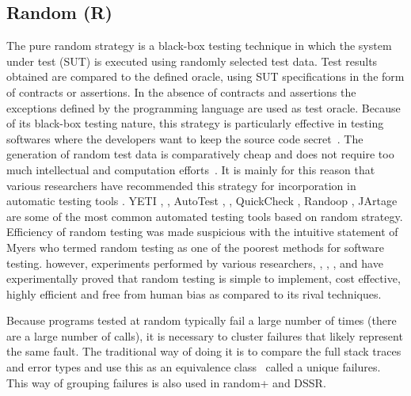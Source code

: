 \documentclass[conference]{IEEEtran}
\begin{document}
\subsection{Random (R)}
The pure random strategy is a black-box testing technique in which the system under test (SUT) is executed using randomly selected test data. Test results obtained are compared to the defined oracle, using SUT specifications in the form of contracts or assertions. In the absence of contracts and assertions the exceptions defined by the programming language are used as test oracle. 
Because of its black-box testing nature, this strategy is particularly effective in testing softwares where the developers want to keep the source code secret~\cite{Chen2010}. The generation of random test data is comparatively cheap and does not require too much intellectual and computation efforts~\cite{Ciupa2009, Ciupa2008}. It is mainly for this reason that various researchers have recommended this strategy for incorporation in automatic testing tools \cite{Ciupa2008a}. YETI \cite{Oriol2010a}, \cite{Oriol2010}, AutoTest \cite{Leitner2007}, \cite{Ciupa2007}, QuickCheck \cite{Claessen2000}, Randoop \cite{Pacheco2007}, JArtage \cite{Oriat2004} are some of the most common automated testing tools based on random strategy.\\
\indent Efficiency of random testing was made suspicious with the intuitive statement of Myers \cite{Myers2004} who termed random testing as one of the poorest methods for software testing. however, experiments performed by various researchers, \cite{Ciupa2007}, \cite{Duran1981}, \cite{Duran1984}, \cite{Hamlet1994} and \cite{Ntafos2001} have experimentally proved that random testing is simple to implement, cost effective, highly efficient and free from human bias as compared to its rival techniques.\

Because programs tested at random typically fail a large number of times (there are a large number of calls), it is necessary to cluster failures that likely represent the same fault. The traditional way of doing it is to compare the full stack traces and error types and use this as an equivalence class~\cite{Ciupa2007,Oriol2012} called a unique failures. This way of grouping failures is also used in random+ and DSSR.
\end{document}
